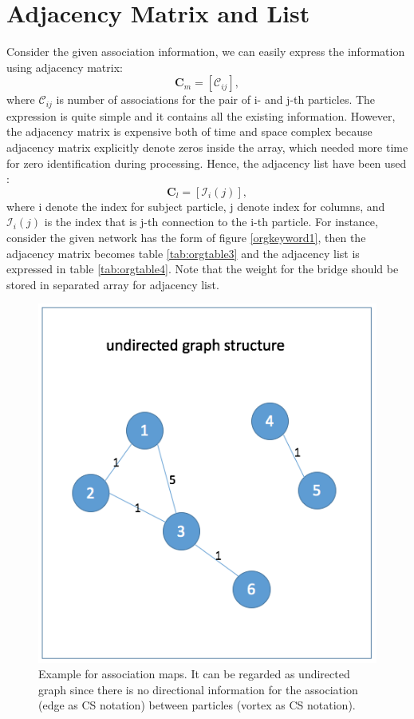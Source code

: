 \documentclass[11pt]{article}
\begin{document}
\section{Adjacency Matrix and List}
\label{sec:orgheadline3}
Consider the given association information, we can easily express the information using adjacency matrix:
\begin{equation}
\mathbf{C}_m = \left[\mathscr{C}_{ij}\right],
\end{equation}
where \(\mathscr{C}_{ij}\) is number of associations for the pair of i- and j-th particles.
The expression is quite simple and it contains all the existing information. However, the adjacency matrix is expensive both of time and space complex because adjacency matrix explicitly denote zeros inside the array, which needed more time for zero identification during processing. Hence, the adjacency list have been used :
\begin{equation}
\mathbf{C}_l = \left[\mathscr{I}_{i}(j)\right],
\end{equation}
where i denote the index for subject particle, j denote index for columns, and \(\mathscr{I}_{i}(j)\) is the index that is j-th connection to the i-th particle. 
For instance, consider the given network has the form of figure \ref{orgkeyword1}, then the adjacency matrix becomes table \ref{tab:orgtable3} and the adjacency list is expressed in table \ref{tab:orgtable4}. Note that the weight for the bridge should be stored in separated array for adjacency list.

\begin{figure}[htb]
\centering
\includegraphics[width=.9\linewidth]{data_structure/ex_graph_association.png}
\caption{Example for association maps. It can be regarded as undirected graph since there is no directional information for the association (edge as CS notation) between particles (vortex as CS notation).}
\end{figure}
\end{document}
